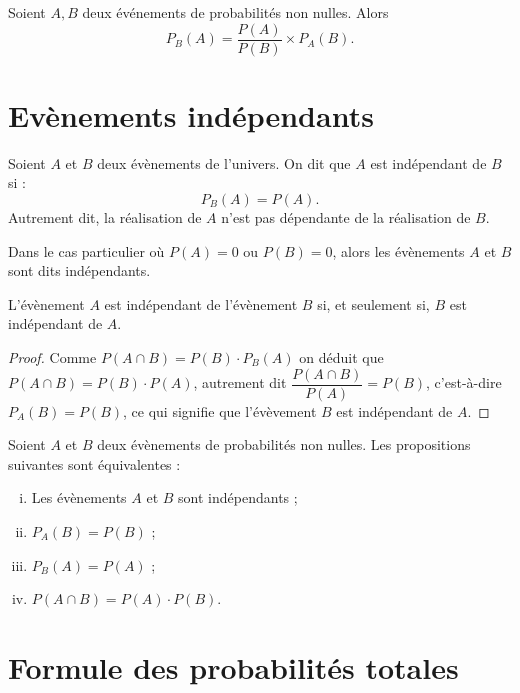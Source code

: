 \documentclass[a4paper, 12pt]{report}
\begin{document}
\begin{thm}[de Bayes]
Soient $A, B$ deux événements de probabilités non nulles. Alors
\[ P_B(A) = \dfrac{P(A)}{P(B)} \times P_A(B). \]
\end{thm}

\section{Evènements indépendants}

\begin{defn}[indépencance]
Soient $A$ et $B$ deux évènements de l'univers. On dit que $A$ est indépendant de $B$ si :
\[ P_B(A) = P(A) . \]
Autrement dit, la réalisation de $A$ n'est pas dépendante de la réalisation de $B$.
\end{defn}

\begin{rmq}
Dans le cas particulier où $P(A) = 0$ ou $P(B)=0$, alors les évènements $A$ et $B$ sont dits indépendants.
\end{rmq}

\begin{prop}
L'évènement $A$ est indépendant de l'évènement $B$ si, et seulement si, $B$ est indépendant de $A$.
\end{prop}

\begin{proof}
Comme $P(A \cap B) = P(B) \cdot P_B(A)$ on déduit que $P(A \cap B) = P(B) \cdot P(A)$, autrement dit $\dfrac{P(A \cap B)}{P(A)} = P(B)$,
c'est-à-dire $P_A(B) = P(B)$, ce qui signifie que l'évèvement $B$ est indépendant de $A$.
\end{proof}

\begin{prop}
Soient $A$ et $B$ deux évènements de probabilités non nulles. Les propositions suivantes sont équivalentes :
\begin{enumerate}[(i)]
\item Les évènements $A$ et $B$ sont indépendants ;
\item $P_A(B) = P(B)$ ;
\item $P_B(A) = P(A)$ ;
\item $P(A \cap B) = P(A) \cdot P(B)$.
\end{enumerate}
\end{prop}

\section{Formule des probabilités totales}
\end{document}
